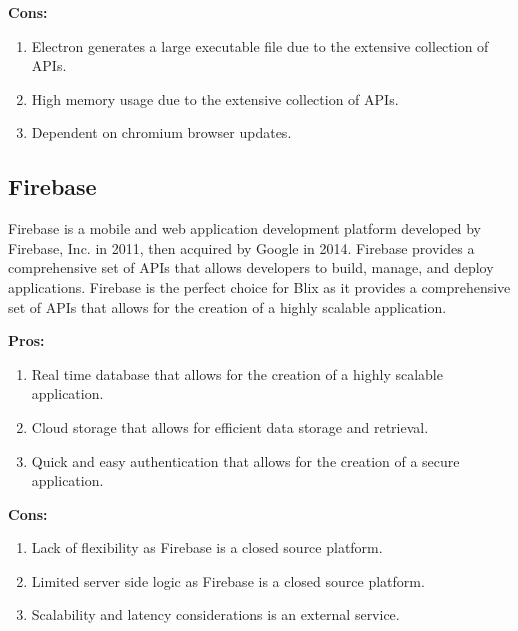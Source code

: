 \documentclass[11pt,a4paper]{article}
\begin{document}
\textbf{Cons:}

\begin{enumerate}[label*=\arabic*.]
	\item[\textbullet] Electron generates a large executable file due to the extensive collection of APIs.
	\item[\textbullet] High memory usage due to the extensive collection of APIs.
	\item[\textbullet] Dependent on chromium browser updates.
\end{enumerate}


\subsection{Firebase}

Firebase is a mobile and web application development platform developed by Firebase, Inc. in 2011, then acquired by Google in 2014.
Firebase provides a comprehensive set of APIs that allows developers to build, manage, and deploy applications.
Firebase is the perfect choice for Blix as it provides a comprehensive set of APIs that allows for the creation of a highly scalable application.

\textbf{Pros:}
\begin{enumerate}[label*=\arabic*.]
	\item[\textbullet] Real time database that allows for the creation of a highly scalable application.
	\item[\textbullet] Cloud storage that allows for efficient data storage and retrieval.
	\item[\textbullet] Quick and easy authentication that allows for the creation of a secure application.
\end{enumerate}

\textbf{Cons:}
\begin{enumerate}[label*=\arabic*.]
	\item[\textbullet] Lack of flexibility as Firebase is a closed source platform.
	\item[\textbullet] Limited server side logic as Firebase is a closed source platform.
	\item[\textbullet] Scalability and latency considerations is an external service.
\end{enumerate}
\end{document}
